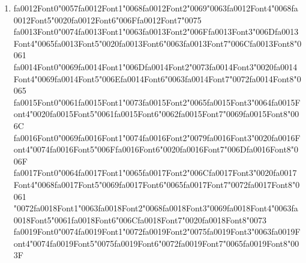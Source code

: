 \documentclass[12pt]{article}
\begin{document}
\begin{enumerate}[label=Q\arabic*.]
 \item {\csname fa0012Font0\endcsname\char"0057}{\csname fa0012Font1\endcsname\char"0068}{\csname fa0012Font2\endcsname\char"0069}{\char"0063}{\csname fa0012Font4\endcsname\char"0068}{\csname fa0012Font5\endcsname\char"0020}{\csname fa0012Font6\endcsname\char"006F}{\csname fa0012Font7\endcsname\char"0075} {\csname fa0013Font0\endcsname\char"0074}{\csname fa0013Font1\endcsname\char"0063}{\csname fa0013Font2\endcsname\char"006F}{\csname fa0013Font3\endcsname\char"006D}{\csname fa0013Font4\endcsname\char"0065}{\csname fa0013Font5\endcsname\char"0020}{\csname fa0013Font6\endcsname\char"0063}{\csname fa0013Font7\endcsname\char"006C}{\csname fa0013Font8\endcsname\char"0061} {\csname fa0014Font0\endcsname\char"0069}{\csname fa0014Font1\endcsname\char"006D}{\csname fa0014Font2\endcsname\char"0073}{\csname fa0014Font3\endcsname\char"0020}{\csname fa0014Font4\endcsname\char"0069}{\csname fa0014Font5\endcsname\char"006E}{\csname fa0014Font6\endcsname\char"0063}{\csname fa0014Font7\endcsname\char"0072}{\csname fa0014Font8\endcsname\char"0065} {\csname fa0015Font0\endcsname\char"0061}{\csname fa0015Font1\endcsname\char"0073}{\csname fa0015Font2\endcsname\char"0065}{\csname fa0015Font3\endcsname\char"0064}{\csname fa0015Font4\endcsname\char"0020}{\csname fa0015Font5\endcsname\char"0061}{\csname fa0015Font6\endcsname\char"0062}{\csname fa0015Font7\endcsname\char"0069}{\csname fa0015Font8\endcsname\char"006C} {\csname fa0016Font0\endcsname\char"0069}{\csname fa0016Font1\endcsname\char"0074}{\csname fa0016Font2\endcsname\char"0079}{\csname fa0016Font3\endcsname\char"0020}{\csname fa0016Font4\endcsname\char"0074}{\csname fa0016Font5\endcsname\char"006F}{\csname fa0016Font6\endcsname\char"0020}{\csname fa0016Font7\endcsname\char"006D}{\csname fa0016Font8\endcsname\char"006F} {\csname fa0017Font0\endcsname\char"0064}{\csname fa0017Font1\endcsname\char"0065}{\csname fa0017Font2\endcsname\char"006C}{\csname fa0017Font3\endcsname\char"0020}{\csname fa0017Font4\endcsname\char"0068}{\csname fa0017Font5\endcsname\char"0069}{\csname fa0017Font6\endcsname\char"0065}{\csname fa0017Font7\endcsname\char"0072}{\csname fa0017Font8\endcsname\char"0061} {\char"0072}{\csname fa0018Font1\endcsname\char"0063}{\csname fa0018Font2\endcsname\char"0068}{\csname fa0018Font3\endcsname\char"0069}{\csname fa0018Font4\endcsname\char"0063}{\csname fa0018Font5\endcsname\char"0061}{\csname fa0018Font6\endcsname\char"006C}{\csname fa0018Font7\endcsname\char"0020}{\csname fa0018Font8\endcsname\char"0073} {\csname fa0019Font0\endcsname\char"0074}{\csname fa0019Font1\endcsname\char"0072}{\csname fa0019Font2\endcsname\char"0075}{\csname fa0019Font3\endcsname\char"0063}{\csname fa0019Font4\endcsname\char"0074}{\csname fa0019Font5\endcsname\char"0075}{\csname fa0019Font6\endcsname\char"0072}{\csname fa0019Font7\endcsname\char"0065}{\csname fa0019Font8\endcsname\char"003F}

\end{enumerate}
\end{document}
